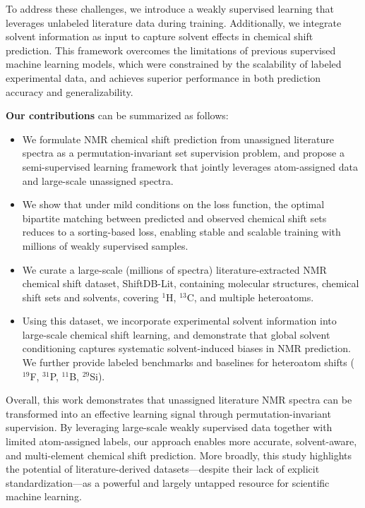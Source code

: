 To address these challenges, we introduce a weakly supervised learning that leverages unlabeled literature data during training. Additionally, we integrate solvent information as input to capture solvent effects in chemical shift prediction. This framework overcomes the limitations of previous supervised machine learning models, which were constrained by the scalability of labeled experimental data, and achieves superior performance in both prediction accuracy and generalizability.


\textbf{Our contributions} can be summarized as follows:
\begin{itemize}
\item We formulate NMR chemical shift prediction from unassigned literature spectra as a permutation-invariant set supervision problem, and propose a semi-supervised learning framework that jointly leverages atom-assigned data and large-scale unassigned spectra.
\item We show that under mild conditions on the loss function, the optimal bipartite matching between predicted and observed chemical shift sets reduces to a sorting-based loss, enabling stable and scalable training with millions of weakly supervised samples.
\item We curate a large-scale (millions of spectra) literature-extracted NMR chemical shift dataset, ShiftDB-Lit, containing molecular structures, chemical shift sets and solvents, covering $^1$H, $^{13}$C, and multiple heteroatoms.
\item Using this dataset, we incorporate experimental solvent information into large-scale chemical shift learning, and demonstrate that global solvent conditioning captures systematic solvent-induced biases in NMR prediction. 
We further provide labeled benchmarks and baselines for heteroatom shifts ($^{19}$F, $^{31}$P, $^{11}$B, $^{29}$Si).
\end{itemize}

Overall, this work demonstrates that unassigned literature NMR spectra can be transformed into an effective learning signal through permutation-invariant supervision. 
By leveraging large-scale weakly supervised data together with limited atom-assigned labels, our approach enables more accurate, solvent-aware, and multi-element chemical shift prediction. 
More broadly, this study highlights the potential of literature-derived datasets—despite their lack of explicit standardization—as a powerful and largely untapped resource for scientific machine learning.

